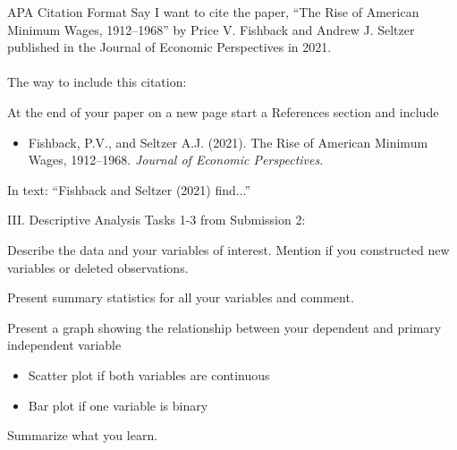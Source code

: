 \documentclass{./../Lectures/div_teaching_slides}
\begin{document}
\begin{frame}{APA Citation Format}
Say I want to cite the paper, ``The Rise of American Minimum Wages, 1912–1968'' by Price V. Fishback and Andrew J. Seltzer published in the Journal of Economic Perspectives in 2021. \\~\\
The way to include this citation: \\
\begin{witemize}
  \item At the end of your paper on a new page start a References section and include \\
 \begin{itemize}
  \item [] Fishback, P.V., and Seltzer A.J. (2021). The Rise of American Minimum Wages, 1912–1968. \textit{Journal of Economic Perspectives}.
\end{itemize}
\item In text: ``Fishback and Seltzer (2021) find...''
\end{witemize}
\end{frame}

\begin{frame}{III. Descriptive Analysis}
Tasks 1-3 from Submission 2: \\ \vspace{0.25em}
\begin{wenumerate}
  \item Describe the data and your variables of interest. Mention if you constructed new variables or deleted observations.  
  \item Present summary statistics for all your variables and comment.
  \item Present a graph showing the relationship between your dependent and primary independent variable \\
  \begin{itemize}
  \item Scatter plot if both variables are continuous
  \item Bar plot if one variable is binary
\end{itemize}
Summarize what you learn. 
\end{wenumerate}
\end{frame}
\end{document}
